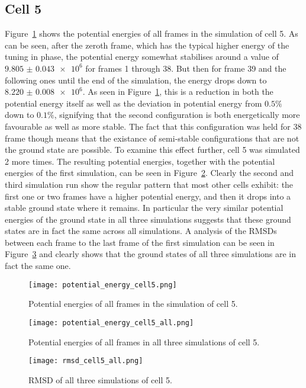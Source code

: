 
\subsection{Cell 5} %
\label{sub:cell_5}

Figure~\ref{img:potential_energy_cell5} shows the potential energies of all frames in the simulation of cell 5. As can be seen, after the zeroth frame, which has the typical higher energy of the tuning in phase, the potential energy somewhat stabilises around a value of \(\num{9.805(43)e6}\) for frames 1 through 38. But then for frame 39 and the following ones until the end of the simulation, the energy drops down to \(\num{8.220(8)e6}\). As seen in Figure~\ref{img:potential_energy_cell5}, this is a reduction in both the potential energy itself as well as the deviation in potential energy from \(0.5 \%\) down to \(0.1 \%\), signifying that the second configuration is both energetically more favourable as well as more stable. The fact that this configuration was held for 38 frame though means that the existance of semi-stable configurations that are not the ground state are possible. To examine this effect further, cell 5 was simulated 2 more times. The resulting potential energies, together with the potential energies of the first simulation, can be seen in Figure~\ref{img:potential_energy_cell5_all}. Clearly the second and third simulation run show the regular pattern that most other cells exhibit: the first one or two frames have a higher potential energy, and then it drops into a stable ground state where it remains. In particular the very similar potential energies of the ground state in all three simulations suggests that these ground states are in fact the same across all simulations. A analysis of the RMSDs between each frame to the last frame of the first simulation can be seen in Figure~\ref{img:rmsd_cell5_all} and clearly shows that the ground states of all three simulations are in fact the same one.

\begin{figure}[ht]
\centering
  \texttt{[image: potential\_energy\_cell5.png]}
  \caption{Potential energies of all frames in the simulation of cell 5.}
  \label{img:potential_energy_cell5}
\end{figure}

\begin{figure}[ht]
\centering
  \texttt{[image: potential\_energy\_cell5\_all.png]}
  \caption{Potential energies of all frames in all three simulations of cell 5.}
  \label{img:potential_energy_cell5_all}
\end{figure}

\begin{figure}[ht]
\centering
  \texttt{[image: rmsd\_cell5\_all.png]}
  \caption{RMSD of all three simulations of cell 5.}
  \label{img:rmsd_cell5_all}
\end{figure}





